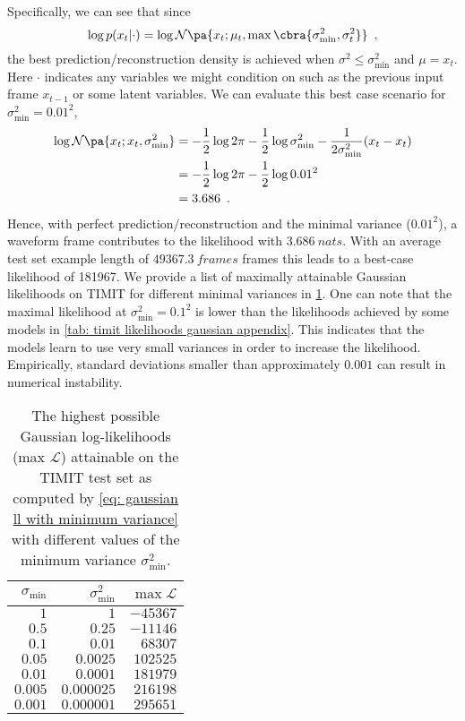 Specifically, we can see that since
\begin{equation}
    \log p(x_t|\cdot) = \log \mathcal{N}\pa{x_t; \mu_t, \max\cbra{\sigma_\text{min}^2, \sigma_t^2}}\enspace \label{eq: gaussian ll with minimum variance} ,
\end{equation}
the best prediction/reconstruction density is achieved when $\sigma^2 \leq \sigma_\text{min}^2$ and $\mu=x_t$. 
Here $\cdot$ indicates any variables we might condition on such as the previous input frame $x_{t-1}$ or some latent variables.
We can evaluate this best case scenario for $\sigma_\text{min}^2 = 0.01^2$,
\begin{align}
    \log \mathcal{N}\pa{x_t; x_t, \sigma_\text{min}^2} &= -\frac{1}{2}\log 2\pi - \frac{1}{2}\log \sigma_\text{min}^2 - \frac{1}{2\sigma_\text{min}^2} (x_t - x_t) \nonumber \\
    &= -\frac{1}{2}\log 2\pi - \frac{1}{2}\log 0.01^2 \nonumber \\
    &= 3.686 \enspace . 
\end{align}
Hence, with perfect prediction/reconstruction and the minimal variance ($0.01^2$), a waveform frame contributes to the likelihood with $\SI{3.686}{nats}$. With an average test set example length of $\SI{49367.3}{frames}$ frames this leads to a best-case likelihood of 181967. We provide a list of maximally attainable Gaussian likelihoods on TIMIT for different minimal variances in \cref{tab:timit best gaussian ll}. One can note that the maximal likelihood at $\sigma_\text{min}^2=0.1^2$ is lower than the likelihoods achieved by some models in \cref{tab: timit likelihoods gaussian appendix}. This indicates that the models learn to use very small variances in order to increase the likelihood. Empirically, standard deviations smaller than approximately $0.001$ can result in numerical instability.


\begin{table}[t!]
    \centering
    \begin{tabular}{rrr}
    \toprule
    $\sigma_\text{min}$ & $\sigma_\text{min}^2$ & $\max\mathcal{L}$ \\
    \midrule
    $1$      & $1$           &    $-45367$ \\
    $0.5$    & $0.25$        &    $-11146$ \\
    $0.1$    & $0.01$        &     $68307$ \\
    $0.05$   & $0.0025$      &    $102525$ \\
    $0.01$   & $0.0001$      &    $181979$ \\
    $0.005$  & $0.000025$    &    $216198$ \\
    $0.001$  & $0.000001$    &    $295651$ \\
    \bottomrule
    \end{tabular}
    \caption{The highest possible Gaussian log-likelihoods (max $\mathcal{L}$) attainable on the TIMIT test set as computed by \eqref{eq: gaussian ll with minimum variance} with different values of the minimum variance $\sigma^2_\text{min}$.}
    \label{tab:timit best gaussian ll}
\end{table}




